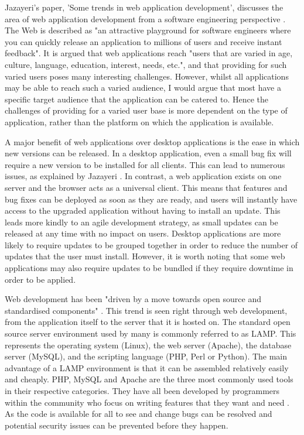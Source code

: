 \documentclass[authoryearcitations]{UoYCSproject}
\begin{document}
Jazayeri's paper, 'Some trends in web application development', discusses the area of web application development from a software engineering perspective \citep{Jazayeri2007}. The Web is described as "an attractive playground for software engineers where you can quickly release an application to millions of users and receive instant feedback". It is argued that web applications reach "users that are varied in age, culture, language, education, interest, needs, etc.", and that providing for such varied users poses many interesting challenges. However, whilst all applications may be able to reach such a varied audience, I would argue that most have a specific target audience that the application can be catered to. Hence the challenges of providing for a varied user base is more dependent on the type of application, rather than the platform on which the application is available. 

A major benefit of web applications over desktop applications is the ease in which new versions can be released. In a desktop application, even a small bug fix will require a new version to be installed for all clients. This can lead to numerous issues, as explained by Jazayeri \citep{Jazayeri2007}. In contrast, a web application exists on one server and the browser acts as a universal client. This means that features and bug fixes can be deployed as soon as they are ready, and users will instantly have access to the upgraded application without having to install an update. This leads more kindly to an agile development strategy, as small updates can be released at any time with no impact on users. Desktop applications are more likely to require updates to be grouped together in order to reduce the number of updates that the user must install. However, it is worth noting that some web applications may also require updates to be bundled if they require downtime in order to be applied.  

Web development has been "driven by a move towards open source and standardised components" \citep{Jazayeri2007}. This trend is seen right through web development, from the application itself to the server that it is hosted on. The standard open source server environment used by many is commonly referred to as LAMP. This represents the operating system (Linux), the web server (Apache), the database server (MySQL), and the scripting language (PHP, Perl or Python). The main advantage of a  LAMP environment is that it can be assembled relatively easily and cheaply. PHP, MySQL and Apache are the three most commonly used tools in their respective categories. They have all been developed by programmers within the community who focus on writing features that they want and need \citep{Nixon2009}. As the code is available for all to see and change bugs can be resolved and potential security issues can be prevented before they happen.
\end{document}
